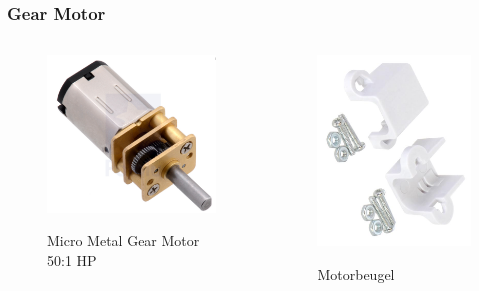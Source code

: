 \documentclass
   [kulak] %
   {kulakbeamer}
\begin{document}
\begin{frame}
	\frametitle{Gear Motor}
	\begin{columns}
		\begin{figure}
			\centering
			\includegraphics[width=.6\textwidth]{gear}
			\caption{Micro Metal Gear Motor 50:1 HP}\cite{MicroMetalGearMotor50:1HP}
		\end{figure}
		\begin{figure}
			\centering
			\includegraphics[width=.7\textwidth]{beugel}
			\caption{Motorbeugel}\cite{MicroMetalGearMotorBeugel}
		\end{figure}
	\end{columns}
	
\end{frame}
\end{document}
